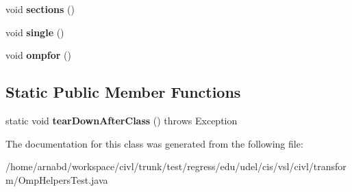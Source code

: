 \begin{DoxyCompactItemize}
\item 
\hypertarget{classedu_1_1udel_1_1cis_1_1vsl_1_1civl_1_1transform_1_1OmpHelpersTest_a7581160d4d593d9fe4ff25378903c8c8}{}void {\bfseries sections} ()\label{classedu_1_1udel_1_1cis_1_1vsl_1_1civl_1_1transform_1_1OmpHelpersTest_a7581160d4d593d9fe4ff25378903c8c8}

\item 
\hypertarget{classedu_1_1udel_1_1cis_1_1vsl_1_1civl_1_1transform_1_1OmpHelpersTest_a9fc0a40a4174e5010813309a866fc532}{}void {\bfseries single} ()\label{classedu_1_1udel_1_1cis_1_1vsl_1_1civl_1_1transform_1_1OmpHelpersTest_a9fc0a40a4174e5010813309a866fc532}

\item 
\hypertarget{classedu_1_1udel_1_1cis_1_1vsl_1_1civl_1_1transform_1_1OmpHelpersTest_a7ef96a4d9886ec9b74c4ec7cf075e380}{}void {\bfseries ompfor} ()\label{classedu_1_1udel_1_1cis_1_1vsl_1_1civl_1_1transform_1_1OmpHelpersTest_a7ef96a4d9886ec9b74c4ec7cf075e380}

\end{DoxyCompactItemize}
\subsection*{Static Public Member Functions}
\begin{DoxyCompactItemize}
\item 
\hypertarget{classedu_1_1udel_1_1cis_1_1vsl_1_1civl_1_1transform_1_1OmpHelpersTest_aee706684ec56e42f6642168594d846ad}{}static void {\bfseries tear\+Down\+After\+Class} ()  throws Exception \label{classedu_1_1udel_1_1cis_1_1vsl_1_1civl_1_1transform_1_1OmpHelpersTest_aee706684ec56e42f6642168594d846ad}

\end{DoxyCompactItemize}


The documentation for this class was generated from the following file\+:\begin{DoxyCompactItemize}
\item 
/home/arnabd/workspace/civl/trunk/test/regress/edu/udel/cis/vsl/civl/transform/Omp\+Helpers\+Test.\+java\end{DoxyCompactItemize}
